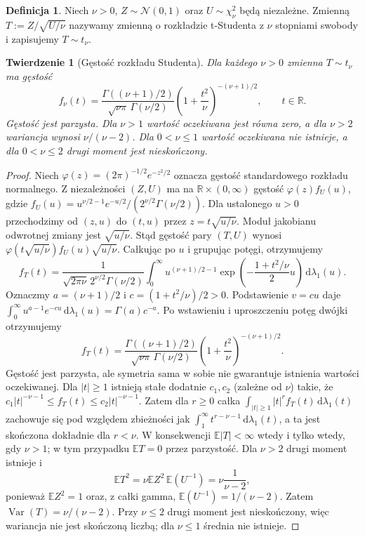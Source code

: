 \documentclass[11pt,a4paper,oneside]{report}
\numberwithin{equation}{chapter}
\theoremstyle{plain}
\newtheorem{twierdzenie}{Twierdzenie}[chapter]
\theoremstyle{definition}
\newtheorem{definicja}{Definicja}[chapter]
\theoremstyle{remark}
\newcommand{\R}{\mathbb{R}}
\newcommand{\E}{\mathbb{E}}
\newcommand{\Var}{\operatorname{Var}}
\newcommand{\dd}{\mathrm{d}}
\newcommand{\Normal}{\mathcal{N}}
\begin{document}
\begin{definicja}
Niech $\nu>0$, $Z\sim\Normal(0,1)$ oraz
$U\sim\chi^2_\nu$ będą niezależne. Zmienną
$T:=Z/\sqrt{U/\nu}$ nazywamy zmienną o rozkładzie
t-Studenta z $\nu$ stopniami swobody i zapisujemy $T\sim t_\nu$.
\end{definicja}

\begin{twierdzenie}[Gęstość rozkładu Studenta]
Dla każdego $\nu>0$ zmienna $T\sim t_\nu$ ma gęstość
\begin{equation}\label{eq:student}
f_\nu(t)=
\frac{\Gamma((\nu+1)/2)}{\sqrt{\nu\pi}\,\Gamma(\nu/2)}
\left(1+\frac{t^2}{\nu}\right)^{-(\nu+1)/2},
\qquad t\in\R.
\end{equation}
Gęstość jest parzysta. Dla $\nu>1$ wartość oczekiwana
jest równa zero, a dla $\nu>2$ wariancja wynosi $\nu/(\nu-2)$.
Dla $0<\nu\leq1$ wartość oczekiwana nie istnieje,
a dla $0<\nu\leq2$ drugi moment jest nieskończony.
\end{twierdzenie}
\begin{proof}
Niech $\varphi(z)=(2\pi)^{-1/2}e^{-z^2/2}$ oznacza
gęstość standardowego rozkładu normalnego.
Z niezależności $(Z,U)$ ma na $\R\times(0,\infty)$
gęstość $\varphi(z)f_U(u)$, gdzie
$f_U(u)=u^{\nu/2-1}e^{-u/2}/(2^{\nu/2}\Gamma(\nu/2))$.
Dla ustalonego $u>0$ przechodzimy od
$(z,u)$ do $(t,u)$ przez $z=t\sqrt{u/\nu}$.
Moduł jakobianu odwrotnej zmiany jest
$\sqrt{u/\nu}$. Stąd gęstość pary $(T,U)$
wynosi $\varphi(t\sqrt{u/\nu})f_U(u)\sqrt{u/\nu}$.
Całkując po $u$ i grupując potęgi, otrzymujemy
\[
f_T(t)=\frac1{\sqrt{2\pi\nu}\,2^{\nu/2}\Gamma(\nu/2)}
\int_0^\infty u^{(\nu+1)/2-1}
\exp\!\left(-\frac{1+t^2/\nu}{2}u\right)
\,\dd\lambda_1(u).
\]
Oznaczmy $a=(\nu+1)/2$ i $c=(1+t^2/\nu)/2>0$.
Podstawienie $v=cu$ daje
$\int_0^\infty u^{a-1}e^{-cu}\,\dd\lambda_1(u)
=\Gamma(a)c^{-a}$.
Po wstawieniu i uproszczeniu potęg dwójki
otrzymujemy
\[
f_T(t)=\frac{\Gamma((\nu+1)/2)}
{\sqrt{\nu\pi}\,\Gamma(\nu/2)}
\left(1+\frac{t^2}{\nu}\right)^{-(\nu+1)/2}.
\]
Gęstość jest parzysta, ale symetria sama w sobie
nie gwarantuje istnienia wartości oczekiwanej.
Dla $|t|\geq1$ istnieją stałe dodatnie $c_1,c_2$
(zależne od $\nu$) takie, że
$c_1|t|^{-\nu-1}\leq f_T(t)
\leq c_2|t|^{-\nu-1}$. Zatem dla $r\geq0$
całka $\int_{|t|\geq1}|t|^rf_T(t)\,\dd\lambda_1(t)$
zachowuje się pod względem zbieżności jak
$\int_1^\infty t^{r-\nu-1}\,\dd\lambda_1(t)$,
a ta jest skończona dokładnie dla $r<\nu$.
W konsekwencji $\E|T|<\infty$ wtedy i tylko wtedy,
gdy $\nu>1$; w tym przypadku $\E T=0$ przez parzystość.
Dla $\nu>2$ drugi moment istnieje i
\[
\E T^2=\nu\E Z^2\,\E(U^{-1})
=\nu\frac{1}{\nu-2},
\]
ponieważ $\E Z^2=1$ oraz, z całki gamma,
$\E(U^{-1})=1/(\nu-2)$. Zatem
$\Var(T)=\nu/(\nu-2)$. Przy $\nu\leq2$ drugi
moment jest nieskończony, więc wariancja nie jest
skończoną liczbą; dla $\nu\leq1$ średnia nie istnieje.
\end{proof}
\end{document}
